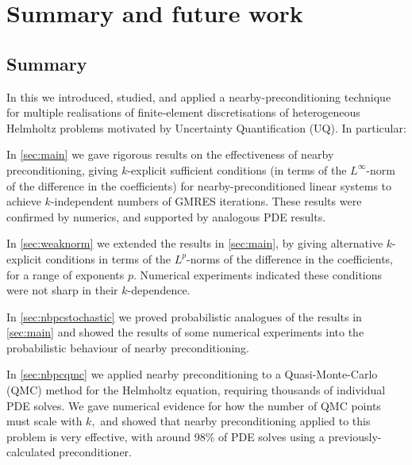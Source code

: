 \section{Summary and future work}

\subsection{Summary}
In this  we introduced, studied, and applied a nearby-preconditioning technique for multiple realisations of finite-element discretisations of heterogeneous Helmholtz problems motivated by Uncertainty Quantification (UQ). In particular:
\bit
\item In \cref{sec:main} we gave rigorous results on the effectiveness of nearby preconditioning, giving $k$-explicit sufficient conditions (in terms of the $L^\infty$-norm of the difference in the coefficients) for nearby-preconditioned linear systems to achieve $k$-independent numbers of GMRES iterations. These results were confirmed by numerics, and supported by analogous PDE results.
\item In \cref{sec:weaknorm} we extended the results in \cref{sec:main}, by giving alternative $k$-explicit conditions in terms of the $L^p$-norms of the difference in the coefficients, for a range of exponents $p.$ Numerical experiments indicated these conditions were not sharp in their $k$-dependence.
\item In \cref{sec:nbpcstochastic} we proved probabilistic analogues of the results in \cref{sec:main} and showed the results of some numerical experiments into the probabilistic behaviour of nearby preconditioning.
  \item In \cref{sec:nbpcqmc} we applied nearby preconditioning to a Quasi-Monte-Carlo (QMC) method for the Helmholtz equation, requiring thousands of individual PDE solves. We gave numerical evidence for how the number of QMC points must scale with $k,$ and showed that nearby preconditioning applied to this problem is very effective, with around 98\% of PDE solves using a previously-calculated preconditioner.
\eit
  
